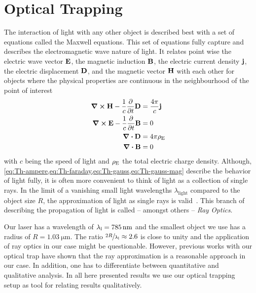 \section{Optical Trapping\label{sec:Th-trapping}}

The interaction of light with any other object is described best with a set of 
equations called the Maxwell equations. This set of equations fully capture and 
describes the electromagnetic wave nature of light. It relates point wise the 
electric wave vector $\vb{E}$, the magnetic induction $\vb{B}$, the electric 
current density $\vb{j}$, the electric displacement $\vb{D}$, and the magnetic 
vector $\vb{H}$ with each other for objects where the physical properties are 
continuous in the neighbourhood of the point of interest~\cite{Born1980Ch1}
\begin{subequations}
  \begin{align}
    \curl{\vb{H}} - \frac{1}{c}\pdv{t}\vb{D} &=\frac{4\pi}{c}\vb{j} 
    \label{eq:Th-ampere} \\
    \curl{\vb{E}} - \frac{1}{c}\pdv{t}\vb{B} &=  0
    \label{eq:Th-faraday} \\
    \div{\vb{D}} &= 4\pi\rho_{\mathrm{E}}
    \label{eq:Th-gauss} \\
    \div{\vb{B}} &= 0
    \label{eq:Th-gauss-mag}
  \end{align}
\end{subequations}
with $c$ being the speed of light and $\rho_{\mathrm{E}}$ the total electric charge 
density. Although, 
\cref{eq:Th-ampere,eq:Th-faraday,eq:Th-gauss,eq:Th-gauss-mag} describe the 
behavior of light fully, it is often more convenient to think of light as a 
collection of single rays. In the limit of a vanishing small light wavelengths 
$\lambda_{\text{light}}$ compared to the object size $R$, the approximation of 
light as single rays is valid~\cite{Born1980Ch3}. This branch of describing the 
propagation of light is called -- amongst others -- \emph{Ray Optics}.

Our laser has a wavelength of $\lal=\SI{785}{\nm}$ and the smallest object we 
use has a radius of $R=\SI{1.03}{\um}$. The ratio $\sfrac{2R}{\lambda_{\mathrm{l}}}\approx 2.6$ 
is close to unity and the application of ray optics in our case might be 
questionable. However, previous works with our optical trap
\cite{Lakaemper2015,Lamprecht2016,Lamprecht2017} have shown that the ray 
approximation is a reasonable approach in our case. In addition, one has to 
differentiate between quantitative and qualitative analysis. In all here 
presented results we use our optical trapping setup as tool for relating 
results qualitatively.

